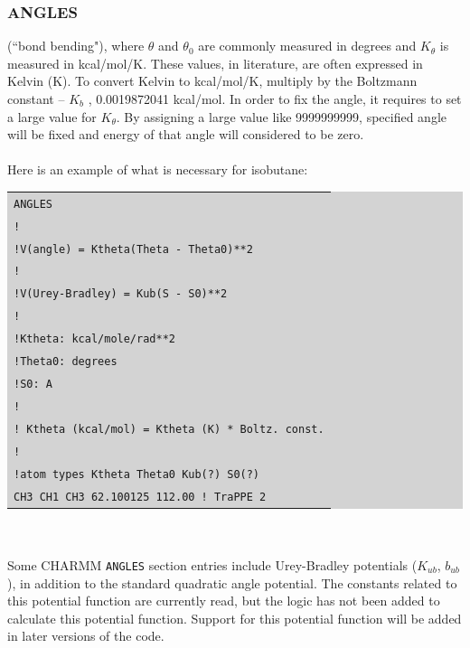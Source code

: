 \subsubsection{ANGLES}
(``bond bending"), where \texttt{$\theta$} and \texttt{$\theta_0$} are commonly measured in degrees and \texttt{$K_{\theta}$} is measured in kcal/mol/K.  These values, in literature, are often expressed in Kelvin (K). To convert Kelvin to kcal/mol/K, multiply by the Boltzmann constant -- \texttt{$K_b$} , 0.0019872041 kcal/mol. In order to fix the angle, it requires to set a large value for \texttt{$K_{\theta}$}. By assigning a large value like 9999999999, specified angle will be fixed and energy of that angle will considered to be zero.\\\\
Here is an example of what is necessary for isobutane:\\
\colorbox{lightgray}{
\begin{tabular}{l}
\texttt{ANGLES}\\
\texttt{!}\\
\texttt{!V(angle) = Ktheta(Theta - Theta0)**2}\\
\texttt{!}\\
\texttt{!V(Urey-Bradley) = Kub(S - S0)**2}\\
\texttt{!}\\
\texttt{!Ktheta: kcal/mole/rad**2}\\
\texttt{!Theta0: degrees}\\
\texttt{!S0: A}\\
\texttt{!}\\
\texttt{! Ktheta (kcal/mol) = Ktheta (K) * Boltz. const.}\\
\texttt{!}\\
\texttt{!atom types         Ktheta       Theta0   Kub(?)  S0(?)}\\
\texttt{CH3 CH1 CH3         62.100125    112.00 ! TraPPE 2}\\
\end{tabular}}\\\\
Some CHARMM \texttt{ANGLES} section entries include Urey-Bradley potentials (\texttt{$K_{ub}$}, \texttt{$b_{ub}$}), in addition to the standard quadratic angle potential. The constants related to this potential function are currently read, but the logic has not been added to calculate this potential function. Support for this potential function will be added in later versions of the code.\\\\
